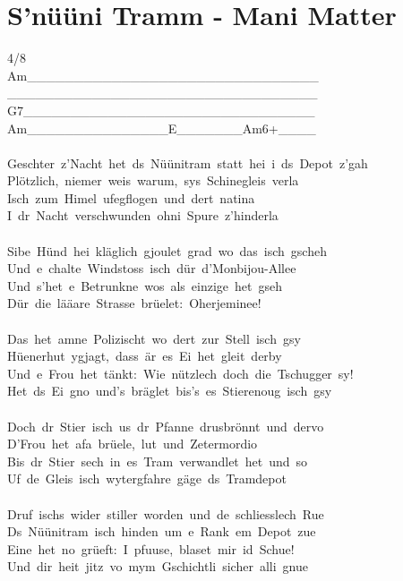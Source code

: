 \documentclass[]{book}
\let\stdsection\section
\renewcommand\section{\clearpage\stdsection}
\begin{document}
\hypertarget{snuuni-tramm---mani-matter}{%
\section{S'nüüni Tramm - Mani Matter}\label{snuuni-tramm---mani-matter}}

4/8\\
\textbar Am\_\_\_\_\_\_\_\textbar\_\_\_\_\_\_\_\_\textbar\_\_\_\_\_\_\_\_\textbar\_\_\_\_\_\_\_\_\textbar{}\\
\textbar\_\_\_\_\_\_\_\_\_\textbar\_\_\_\_\_\_\_\_\textbar\_\_\_\_\_\_\_\_\textbar\_\_\_\_\_\_\_\_\textbar{}\\
\textbar G7\_\_\_\_\_\_\_\textbar\_\_\_\_\_\_\_\_\textbar\_\_\_\_\_\_\_\_\textbar\_\_\_\_\_\_\_\_\textbar{}\\
\textbar Am\_\_\_\_\_\_\_\textbar\_\_\_\_\_\_\_\_\textbar E\_\_\_\_\_\_\_\textbar Am6+\_\_\_\_\textbar{}\\
~\\
Geschter~z'Nacht~het~ds~Nüünitram~statt~hei~i~ds~Depot~z'gah\\
Plötzlich,~niemer~weis~warum,~sys~Schinegleis~verla\\
Isch~zum~Himel~ufegflogen~und~dert~natina\\
I~dr~Nacht~verschwunden~ohni~Spure~z'hinderla\\
~\\
Sibe~Hünd~hei~kläglich~gjoulet~grad~wo~das~isch~gscheh\\
Und~e~chalte~Windstoss~isch~dür~d'Monbijou-Allee\\
Und~s'het~e~Betrunkne~wos~als~einzige~het~gseh\\
Dür~die~lääare~Strasse~brüelet:~Oherjeminee!\\
~\\
Das~het~amne~Polizischt~wo~dert~zur~Stell~isch~gsy\\
Hüenerhut~ygjagt,~dass~är~es~Ei~het~gleit~derby\\
Und~e~Frou~het~tänkt:~Wie~nützlech~doch~die~Tschugger~sy!\\
Het~ds~Ei~gno~und's~bräglet~bis's~es~Stierenoug~isch~gsy\\
~\\
Doch~dr~Stier~isch~us~dr~Pfanne~drusbrönnt~und~dervo\\
D'Frou~het~afa~brüele,~lut~und~Zetermordio\\
Bis~dr~Stier~sech~in~es~Tram~verwandlet~het~und~so\\
Uf~de~Gleis~isch~wytergfahre~gäge~ds~Tramdepot\\
~\\
Druf~ischs~wider~stiller~worden~und~de~schliesslech~Rue\\
Ds~Nüünitram~isch~hinden~um~e~Rank~em~Depot~zue\\
Eine~het~no~grüeft:~I~pfuuse,~blaset~mir~id~Schue!\\
Und~dir~heit~jitz~vo~mym~Gschichtli~sicher~alli~gnue\\
~\\
~\\
\end{document}
